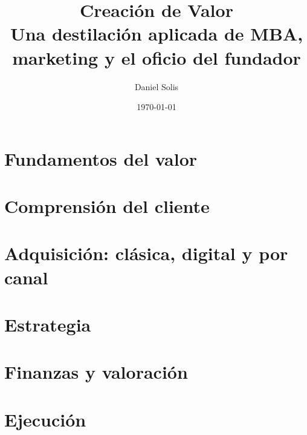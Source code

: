\documentclass[11pt,a4paper]{scrbook}
\title{\textbf{Creación de Valor}\\[0.4em]\large Una destilación aplicada de MBA, marketing y el oficio del fundador}
\author{Daniel Solis}
\date{\today}
\begin{document}
\frontmatter
\maketitle
\tableofcontents

\mainmatter

\part{Fundamentos del valor}





\part{Comprensión del cliente}






\part{Adquisición: clásica, digital y por canal}





\part{Estrategia}





\part{Finanzas y valoración}







\part{Ejecución}



\end{document}

